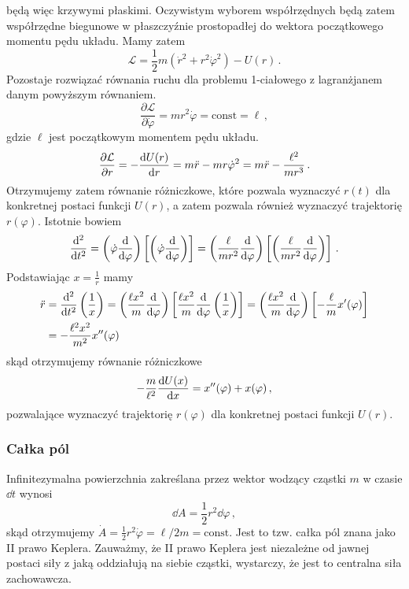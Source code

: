 \documentclass[../main.tex]{subfiles}
\begin{document}
będą więc krzywymi płaskimi. Oczywistym wyborem współrzędnych będą zatem współrzędne biegunowe w
płaszczyźnie prostopadłej do wektora początkowego momentu pędu układu. Mamy zatem
\begin{equation*}
    \mathcal{L}=\frac{1}{2}m(\dot{r}^2+r^2\dot{\varphi}^2)-U(r)\,.
\end{equation*}
Pozostaje rozwiązać równania ruchu dla problemu 1-ciałowego z lagranżjanem danym powyższym
równaniem.
\begin{equation*}
    \frac{\partial\mathcal{L}}{\partial\dot\varphi}=mr^2\dot\varphi=\text{const}=\ell\,,
\end{equation*}
gdzie \(\ell\) jest początkowym momentem pędu układu.
\begin{equation*}
    \frac{\partial \mathcal{L}}{\partial r}=-\dv{U(r)}{r}=m\ddot r-mr\dot{\varphi}^2=m\ddot r-\frac{\ell^2}{mr^3}\,.
\end{equation*}
Otrzymujemy zatem równanie różniczkowe, które pozwala wyznaczyć \(r(t)\) dla konkretnej postaci
funkcji \(U(r)\), a zatem pozwala również wyznaczyć trajektorię \(r(\varphi)\). Istotnie bowiem
\begin{equation*}
    \dv[2]{}{t}=\left(\dot\varphi\dv{}{\varphi}\right)\left[\left(\dot\varphi\dv{}{\varphi}\right)\right]=\left(\frac{\ell}{mr^2}\dv{}{\varphi}\right)\left[\left(\frac{\ell}{mr^2}\dv{}{\varphi}\right)\right]\,.
\end{equation*}
Podstawiając \(x=\frac{1}{r}\) mamy
\begin{equation*}
\begin{split}
    \ddot r&=\dv[2]{}{t}\left(\frac{1}{x}\right)=\left(\frac{\ell x^2}{m}\dv{}{\varphi}\right)\left[\frac{\ell x^2}{m}\dv{}{\varphi}\left(\frac{1}{x}\right)\right]=\left(\frac{\ell x^2}{m}\dv{}{\varphi}\right)\left[-\frac{\ell}{m}x'(\varphi)\right]\\
    &=-\frac{\ell^2x^2}{m^2}x''(\varphi)
\end{split}
\end{equation*}
skąd otrzymujemy równanie różniczkowe
\begin{equation*}
    -\frac{m}{\ell^2}\dv{U(x)}{x}=x''(\varphi)+x(\varphi)\,,
\end{equation*}
pozwalające wyznaczyć trajektorię \(r(\varphi)\) dla konkretnej postaci funkcji \(U(r)\). 
\subsubsection{Całka pól}
Infinitezymalna powierzchnia zakreślana przez wektor wodzący cząstki \(m\) w czasie \(\dd{t}\)
wynosi
\begin{equation*}
    \dd A=\frac{1}{2}r^2\dd{\varphi}\,,
\end{equation*}
skąd otrzymujemy \(\dot A=\frac{1}{2}r^2\dot \varphi=\ell/2m=\text{const}\). Jest to tzw. całka pól
znana jako II prawo Keplera. Zauważmy, że II prawo Keplera jest niezależne od jawnej postaci siły z
jaką oddziałują na siebie cząstki, wystarczy, że jest to centralna siła zachowawcza.
\end{document}
